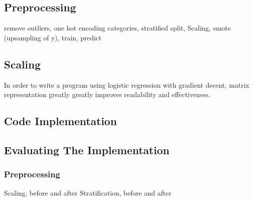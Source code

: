 \documentclass[%
oneside,                 %
final,                   %
10pt]{article}
\begin{document}
\subsection{Preprocessing}
remove outliers,  one hot encoding categories, stratified split, Scaling, smote (upsampling of y), train, predict
\subsection{Scaling} \label{Section_M_Scaling}
 \label{Section_M_Matrixrep}
In order to write a program using logistic regression with gradient decent, matrix representation greatly greatly improves readability and effectiveness. 



\subsection{Code Implementation} \label{Section_M_Codeimpl}
\subsection{Evaluating The Implementation} \label{Section_M_eval}

\subsubsection{Preprocessing}
Scaling, before and after
Stratification, before and after
\end{document}
